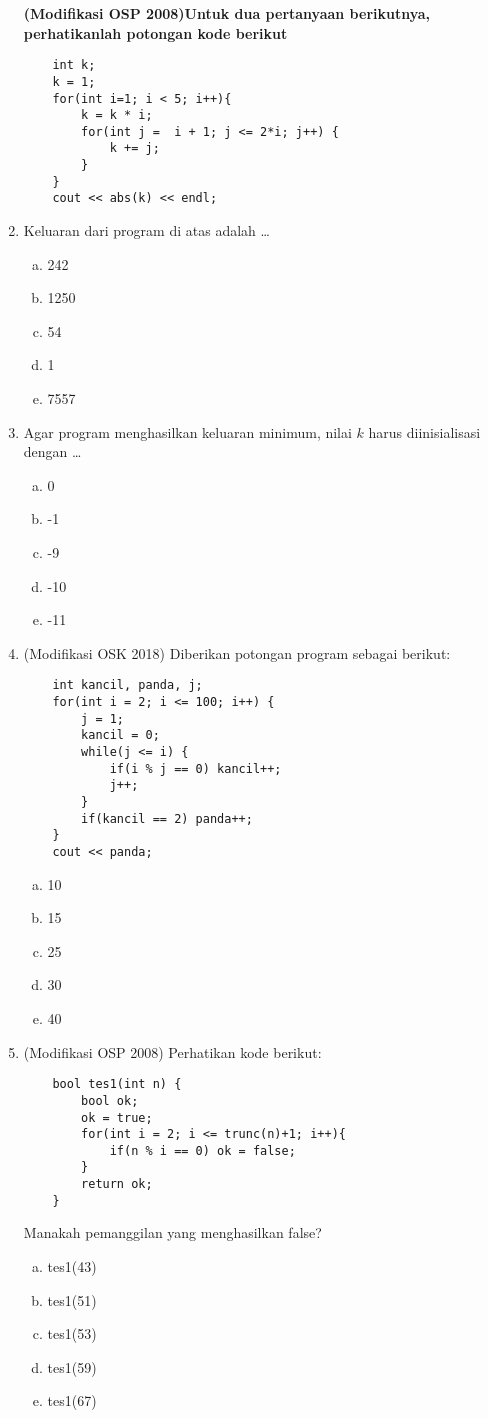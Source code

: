 \begin{enumerate}
	\textbf{(Modifikasi OSP 2008)Untuk dua pertanyaan berikutnya, perhatikanlah potongan kode berikut}
	\begin{lstlisting}
	int k;
	k = 1;
	for(int i=1; i < 5; i++){
		k = k * i;
		for(int j =  i + 1; j <= 2*i; j++) {
			k += j;
		}
	}
	cout << abs(k) << endl;
	\end{lstlisting}
	\item Keluaran dari program di atas adalah \dots
	\begin{enumerate}[a)]
		\item 242
		\item 1250
		\item 54
		\item 1
		\item 7557
	\end{enumerate}
	
	\item Agar program menghasilkan keluaran minimum, 
	nilai $k$ harus diinisialisasi dengan \dots
		\begin{enumerate}[a)]
			\item 0
			\item -1
			\item -9
			\item -10
			\item -11
		\end{enumerate}
		
	\item (Modifikasi OSK 2018) Diberikan potongan program sebagai berikut:
	\begin{lstlisting}
	int kancil, panda, j;
	for(int i = 2; i <= 100; i++) {
		j = 1;
		kancil = 0;
		while(j <= i) {
			if(i % j == 0) kancil++;
			j++;
		}
		if(kancil == 2) panda++;
	}
	cout << panda;
	\end{lstlisting}
\begin{enumerate}[a)]
			\item 10
			\item 15
			\item 25
			\item 30
			\item 40
	\end{enumerate}
	
\item (Modifikasi OSP 2008) Perhatikan kode berikut:
	\begin{lstlisting}
	bool tes1(int n) {
		bool ok;
		ok = true;
		for(int i = 2; i <= trunc(n)+1; i++){
			if(n % i == 0) ok = false;
		}
		return ok;
	}
	\end{lstlisting}
	Manakah pemanggilan yang menghasilkan false?
	\begin{enumerate}[a)]
	\item tes1(43)
	\item tes1(51)
	\item tes1(53)
	\item tes1(59)
	\item tes1(67)
	\end{enumerate}
	

\end{enumerate}

